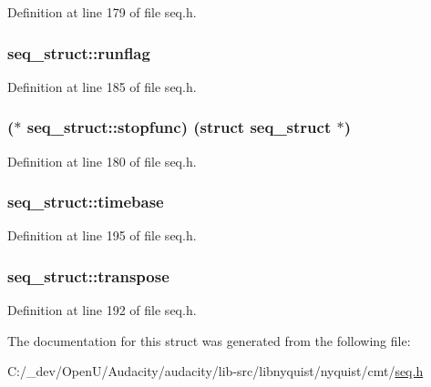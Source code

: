 Definition at line 179 of file seq.\+h.

\subsubsection[{\texorpdfstring{runflag}{runflag}}]{ seq\+\_\+struct\+::runflag}\hypertarget{structseq__struct_ae14efe5315c44b369f5b1779b5a4438b}{}\label{structseq__struct_ae14efe5315c44b369f5b1779b5a4438b}


Definition at line 185 of file seq.\+h.

\subsubsection[{\texorpdfstring{stopfunc}{stopfunc}}]{($\ast$ seq\+\_\+struct\+::stopfunc) (struct {\bf seq\+\_\+struct} $\ast$)}\hypertarget{structseq__struct_ac87c74e4692896b3ca9ee93cf0fcd153}{}\label{structseq__struct_ac87c74e4692896b3ca9ee93cf0fcd153}


Definition at line 180 of file seq.\+h.

\subsubsection[{\texorpdfstring{timebase}{timebase}}]{ seq\+\_\+struct\+::timebase}\hypertarget{structseq__struct_ac4e17bd467dfcd8ae959b294eaead01b}{}\label{structseq__struct_ac4e17bd467dfcd8ae959b294eaead01b}


Definition at line 195 of file seq.\+h.

\subsubsection[{\texorpdfstring{transpose}{transpose}}]{ seq\+\_\+struct\+::transpose}\hypertarget{structseq__struct_a4755a28a383888eec72220027a2f819b}{}\label{structseq__struct_a4755a28a383888eec72220027a2f819b}


Definition at line 192 of file seq.\+h.



The documentation for this struct was generated from the following file\+:\begin{DoxyCompactItemize}
\item 
C\+:/\+\_\+dev/\+Open\+U/\+Audacity/audacity/lib-\/src/libnyquist/nyquist/cmt/\hyperlink{seq_8h}{seq.\+h}\end{DoxyCompactItemize}

